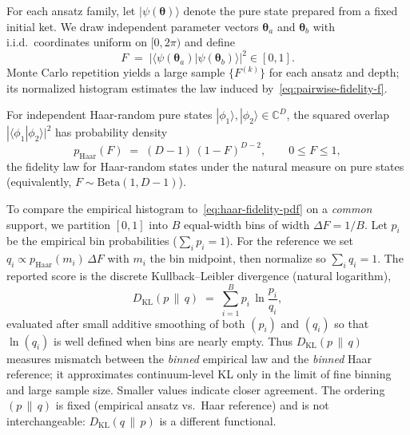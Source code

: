 \documentclass[11pt]{article}
\begin{document}
For each ansatz family, let $|\psi(\boldsymbol{\theta})\rangle$ denote the pure state prepared from a fixed initial ket. We draw independent parameter vectors $\boldsymbol{\theta}_{a}$ and $\boldsymbol{\theta}_{b}$ with i.i.d.\ coordinates uniform on $[0,2\pi)$ and define
\begin{equation}
\label{eq:pairwise-fidelity-f}
F \;=\; \bigl|\langle \psi(\boldsymbol{\theta}_{a}) | \psi(\boldsymbol{\theta}_{b}) \rangle \bigr|^{2} \in [0,1].
\end{equation}
Monte Carlo repetition yields a large sample $\{F^{(k)}\}$ for each ansatz and depth; its normalized histogram estimates the law induced by~\eqref{eq:pairwise-fidelity-f}.

For independent Haar-random pure states $|\phi_{1}\rangle,|\phi_{2}\rangle \in \mathbb{C}^{D}$, the squared overlap $|\langle \phi_{1} | \phi_{2} \rangle|^{2}$ has probability density~\cite{zyczkowski2005}
\begin{equation}
\label{eq:haar-fidelity-pdf}
p_{\mathrm{Haar}}(F) \;=\; (D-1)\,(1-F)^{D-2}, \qquad 0 \le F \le 1,
\end{equation}
the fidelity law for Haar-random states under the natural measure on pure states (equivalently, $F \sim \mathrm{Beta}(1,D-1)$).

To compare the empirical histogram to~\eqref{eq:haar-fidelity-pdf} on a \emph{common} support, we partition $[0,1]$ into $B$ equal-width bins of width $\Delta F = 1/B$. Let $p_{i}$ be the empirical bin probabilities ($\sum_{i} p_{i}=1$). For the reference we set $q_{i} \propto p_{\mathrm{Haar}}(m_{i})\,\Delta F$ with $m_{i}$ the bin midpoint, then normalize so $\sum_{i} q_{i}=1$. The reported score is the discrete Kullback--Leibler divergence (natural logarithm),
\begin{equation}
\label{eq:kl-haar-fidelity}
D_{\mathrm{KL}}(p\,\|\,q) \;=\; \sum_{i=1}^{B} p_{i}\,\ln\frac{p_{i}}{q_{i}},
\end{equation}
evaluated after small additive smoothing of both $(p_{i})$ and $(q_{i})$ so that $\ln(q_{i})$ is well defined when bins are nearly empty. Thus $D_{\mathrm{KL}}(p\,\|\,q)$ measures mismatch between the \emph{binned} empirical law and the \emph{binned} Haar reference; it approximates continuum-level KL only in the limit of fine binning and large sample size. Smaller values indicate closer agreement. The ordering $(p\,\|\,q)$ is fixed (empirical ansatz vs.\ Haar reference) and is not interchangeable: $D_{\mathrm{KL}}(q\,\|\,p)$ is a different functional.
\end{document}
